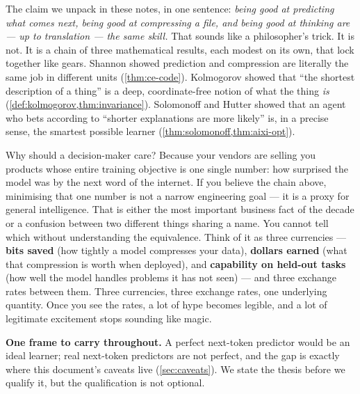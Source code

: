 \documentclass[12pt,a4paper]{article}
\theoremstyle{plain}
\theoremstyle{definition}
\begin{document}
\begin{intuition}
The claim we unpack in these notes, in one sentence: \emph{being good
at predicting what comes next, being good at compressing a file, and
being good at thinking are --- up to translation --- the same skill.}
That sounds like a philosopher's trick.  It is not.  It is a chain of
three mathematical results, each modest on its own, that lock together
like gears.  Shannon showed prediction and compression are literally
the same job in different units (\cref{thm:ce-code}).  Kolmogorov
showed that ``the shortest description of a thing'' is a deep,
coordinate-free notion of what the thing \emph{is}
(\cref{def:kolmogorov,thm:invariance}).  Solomonoff and Hutter showed
that an agent who bets according to ``shorter explanations are more
likely'' is, in a precise sense, the smartest possible learner
(\cref{thm:solomonoff,thm:aixi-opt}).

Why should a decision-maker care?  Because your vendors are selling
you products whose entire training objective is one single number:
how surprised the model was by the next word of the internet.  If you
believe the chain above, minimising that one number is not a narrow
engineering goal --- it is a proxy for general intelligence.  That is
either the most important business fact of the decade or a confusion
between two different things sharing a name.  You cannot tell which
without understanding the equivalence.
Think of it as three currencies --- \textbf{bits saved} (how tightly
a model compresses your data), \textbf{dollars earned} (what that
compression is worth when deployed), and \textbf{capability on
held-out tasks} (how well the model handles problems it has not
seen) --- and three exchange rates between them.  Three currencies,
three exchange rates, one underlying quantity.  Once you see the
rates, a lot of hype becomes legible, and a lot of legitimate
excitement stops sounding like magic.

\textbf{One frame to carry throughout.}  A perfect next-token
predictor would be an ideal learner; real next-token predictors are
not perfect, and the gap is exactly where this document's caveats
live (\cref{sec:caveats}).  We state the thesis before we qualify
it, but the qualification is not optional.
\end{intuition}
\end{document}
